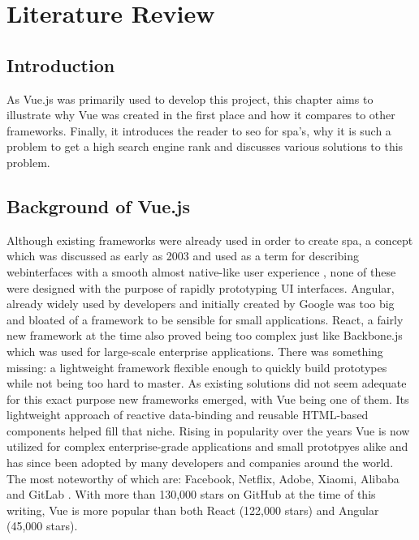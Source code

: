 \chapter[Literature Review]{Literature Review}

\section{Introduction}
As Vue.js was primarily used to develop this project, this chapter aims to illustrate why Vue was created in the first place and how it compares to other frameworks. Finally, it introduces the reader to \acrfull{seo} for \acrfull{spa}'s, why it is such a problem to get a high search engine rank and discusses various solutions to this problem.

\section{Background of Vue.js}
Although existing frameworks were already used in order to create \acrlong{spa}, a concept which was discussed as early as 2003 \cite{Innerbro19:online} and used as a term for describing webinterfaces with a smooth almost native-like user experience \cite{Mikowski:Powell:2013}, none of these were designed with the purpose of rapidly prototyping UI interfaces. Angular, already widely used by developers and initially created by Google was too big and bloated of a framework to be sensible for small applications. React, a fairly new framework at the time also proved being too complex just like Backbone.js which was used for large-scale enterprise applications. There was something missing: a lightweight framework flexible enough to quickly build prototypes while not being too hard to master. As existing solutions did not seem adequate for this exact purpose \cite[p.~10]{filipova2016learning} new frameworks emerged, with Vue being one of them. Its lightweight approach of reactive data-binding and reusable HTML-based components helped fill that niche. Rising in popularity over the years Vue is now utilized for complex enterprise-grade applications and small prototpyes alike and has since been adopted by many developers and companies around the world. The most noteworthy of which are: Facebook, Netflix, Adobe, Xiaomi, Alibaba and GitLab \cite{CompaniesUsingVue:online}. With more than 130,000 stars on GitHub at the time of this writing, Vue is more popular than both React (122,000 stars) and Angular (45,000 stars).


